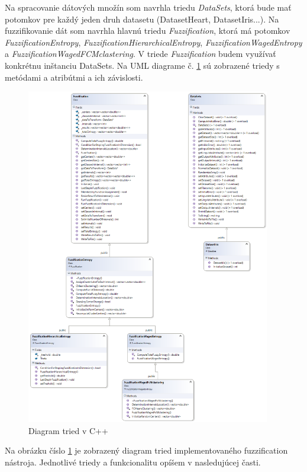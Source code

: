 Na spracovanie dátových množín som navrhla triedu \textit{DataSets}, ktorá bude mať potomkov pre každý jeden druh datasetu (DatasetHeart, DatasetIris...). Na fuzzifikovanie dát som navrhla hlavnú triedu \textit{Fuzzification}, ktorá má potomkov \textit{FuzzificationEntropy}, \textit{FuzzificationHierarchicalEntropy}, \textit{FuzzificationWagedEntropy} a \textit{FuzzificationWagedFCMclastering}. V triede \textit{Fuzzification} budem využívať konkrétnu inštanciu DataSets. Na UML diagrame č.  \ref{fig:pohlad} sú zobrazené triedy s metódami a atribútmi a ich závislosti. 

\begin{figure}[ht]
\includegraphics[width=0.95\textwidth]{obrazky/umldiagramcplusplus.png}
\centering
\caption{Diagram tried v C++} 
\label{fig:pohlad}
\end{figure}



Na obrázku číslo  \ref{fig:pohlad} je zobrazený diagram tried implementovaného fuzzification nástroja. Jednotlivé triedy a funkcionalitu opíšem v nasledujúcej časti. 

